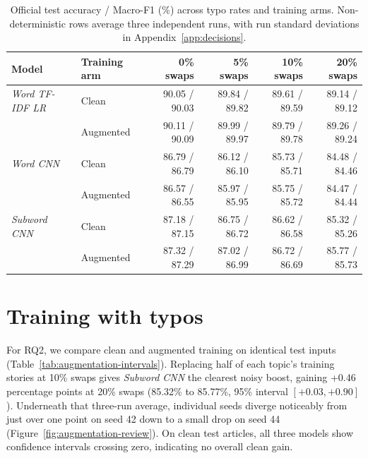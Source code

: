 \begin{table}[H]\centering\normalsize\setlength{\tabcolsep}{4.5pt}
\begin{tabular}{llrrrr}\toprule
Model & Training arm & 0\% swaps & 5\% swaps & 10\% swaps & 20\% swaps \\\midrule
\textit{Word TF-IDF LR} & Clean & 90.05 / 90.03 & 89.84 / 89.82 & 89.61 / 89.59 & 89.14 / 89.12 \\
 & Augmented & 90.11 / 90.09 & 89.99 / 89.97 & 89.79 / 89.78 & 89.26 / 89.24 \\
\textit{Word CNN} & Clean & 86.79 / 86.79 & 86.12 / 86.10 & 85.73 / 85.71 & 84.48 / 84.46 \\
 & Augmented & 86.57 / 86.55 & 85.97 / 85.95 & 85.75 / 85.72 & 84.47 / 84.44 \\
\textit{Subword CNN} & Clean & 87.18 / 87.15 & 86.75 / 86.72 & 86.62 / 86.58 & 85.32 / 85.26 \\
 & Augmented & 87.32 / 87.29 & 87.02 / 86.99 & 86.72 / 86.69 & 85.77 / 85.73 \\\bottomrule
\end{tabular}
\caption[Official test results]{Official test accuracy / Macro-F1 (\%) across typo rates and training arms. Non-deterministic rows average three independent runs, with run standard deviations in Appendix~\ref{app:decisions}.}\label{tab:corefull}
\end{table}

\section{Training with typos}
For RQ2, we compare clean and augmented training on identical test inputs (Table~\ref{tab:augmentation-intervals}). Replacing half of each topic's training stories at 10\% swaps gives \textit{Subword CNN} the clearest noisy boost, gaining +0.46 percentage points at 20\% swaps (85.32\% to 85.77\%, 95\% interval $[+0.03, +0.90]$). Underneath that three-run average, individual seeds diverge noticeably from just over one point on seed 42 down to a small drop on seed 44 (Figure~\ref{fig:augmentation-review}). On clean test articles, all three models show confidence intervals crossing zero, indicating no overall clean gain.


